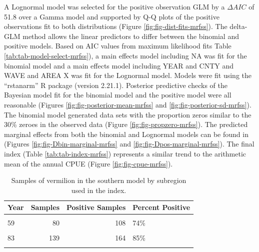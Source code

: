 \documentclass[11pt,
  english,
  a4paper,
]{article}
\begin{document}
A Lognormal model was selected for the positive observation GLM by a {\(\Delta AIC\)\leavevmode\tagmcend\tagstructend} of 51.8 over a Gamma model and supported by Q-Q plots of the positive observations fit to both distributions (Figure \ref{fig:fig-dist-fits-mrfss}). The delta-GLM method allows the linear predictors to differ between the binomial and positive models. Based on AIC values from maximum likelihood fits Table \ref{tab:tab-model-select-mrfss}), a main effects model including NA was fit for the binomial model and a main effects model including YEAR and CNTY and WAVE and AREA X was fit for the Lognormal model. Models were fit using the ``rstanarm'' R package (version 2.21.1). Posterior predictive checks of the Bayesian model fit for the binomial model and the positive model were all reasonable (Figures \ref{fig:fig-posterior-mean-mrfss} and \ref{fig:fig-posterior-sd-mrfss}). The binomial model generated data sets with the proportion zeros similar to the 30\% zeroes in the observed data (Figure \ref{fig:fig-propzero-mrfss}). The predicted marginal effects from both the binomial and Lognormal models can be found in (Figures \ref{fig:fig-Dbin-marginal-mrfss} and \ref{fig:fig-Dpos-marginal-mrfss}). The final index (Table \ref{tab:tab-index-mrfss}) represents a similar trend to the arithmetic mean of the annual CPUE (Figure \ref{fig:fig-cpue-mrfss}).

\newpage

\begin{table}

\caption{\label{tab:tab-region-mrfss}Samples of vermilion in the southern model by subregion used in the index.}
\centering
\begin{tabular}[t]{lrrl}
\toprule
Year & Samples & Positive Samples & Percent Positive\\
\midrule
\cellcolor{gray!6}{37} & \cellcolor{gray!6}{163} & \cellcolor{gray!6}{242} & \cellcolor{gray!6}{67\%}\\
59 & 80 & 108 & 74\%\\
\cellcolor{gray!6}{73} & \cellcolor{gray!6}{131} & \cellcolor{gray!6}{209} & \cellcolor{gray!6}{63\%}\\
83 & 139 & 164 & 85\%\\
\cellcolor{gray!6}{111} & \cellcolor{gray!6}{217} & \cellcolor{gray!6}{320} & \cellcolor{gray!6}{68\%}\\
\bottomrule
\end{tabular}
\end{table}
\end{document}

